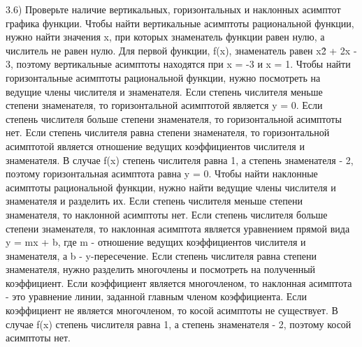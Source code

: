\documentclass{article}
\begin{document}
\large{3.6) Проверьте наличие вертикальных, горизонтальных и наклонных асимптот графика функции.}
\linebreak
\linebreak
\small
Чтобы найти вертикальные асимптоты рациональной функции, нужно найти значения x, при которых знаменатель функции равен нулю, а числитель не равен нулю. Для первой функции, f(x), знаменатель равен x\^2 + 2x - 3, поэтому вертикальные асимптоты находятся при x = -3 и x = 1.
\linebreak
\linebreak
Чтобы найти горизонтальные асимптоты рациональной функции, нужно посмотреть на ведущие члены числителя и знаменателя. Если степень числителя меньше степени знаменателя, то горизонтальной асимптотой является y = 0. Если степень числителя больше степени знаменателя, то горизонтальной асимптоты нет. Если степень числителя равна степени знаменателя, то горизонтальной асимптотой является отношение ведущих коэффициентов числителя и знаменателя. В случае f(x) степень числителя равна 1, а степень знаменателя - 2, поэтому горизонтальная асимптота равна y = 0.
\linebreak
\linebreak
Чтобы найти наклонные асимптоты рациональной функции, нужно найти ведущие члены числителя и знаменателя и разделить их. Если степень числителя меньше степени знаменателя, то наклонной асимптоты нет. Если степень числителя больше степени знаменателя, то наклонная асимптота является уравнением прямой вида y = mx + b, где m - отношение ведущих коэффициентов числителя и знаменателя, а b - y-пересечение. Если степень числителя равна степени знаменателя, нужно разделить многочлены и посмотреть на полученный коэффициент. Если коэффициент является многочленом, то наклонная асимптота - это уравнение линии, заданной главным членом коэффициента. Если коэффициент не является многочленом, то косой асимптоты не существует. В случае f(x) степень числителя равна 1, а степень знаменателя - 2, поэтому косой асимптоты нет.

\newpage
\end{document}
